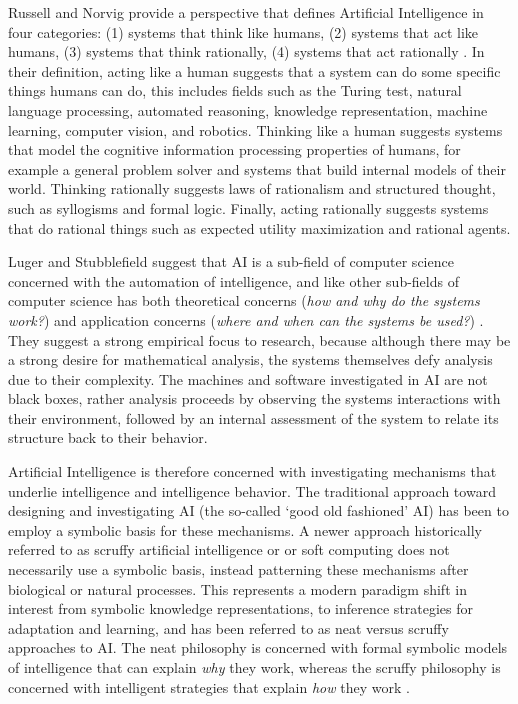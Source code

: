 \documentclass[a4paper, 11pt]{article}
\begin{document}
Russell and Norvig provide a perspective that defines Artificial Intelligence in four categories: (1) systems that think like humans, (2) systems that act like humans, (3) systems that think rationally, (4) systems that act rationally \cite{Russell2009}. In their definition, acting like a human suggests that a system can do some specific things humans can do, this includes fields such as the Turing test, natural language processing, automated reasoning, knowledge representation, machine learning, computer vision, and robotics. Thinking like a human suggests systems that model the cognitive information processing properties of humans, for example a general problem solver and systems that build internal models of their world. Thinking rationally suggests laws of rationalism and structured thought, such as syllogisms and formal logic. Finally, acting rationally suggests systems that do rational things such as expected utility maximization and rational agents. 

Luger and Stubblefield suggest that AI is a sub-field of computer science concerned with the automation of intelligence, and like other sub-fields of computer science has both theoretical concerns (\emph{how and why do the systems work?}) and application concerns (\emph{where and when can the systems be used?}) \cite{Luger1993}. They suggest a strong empirical focus to research, because although there may be a strong desire for mathematical analysis, the systems themselves defy analysis due to their complexity. The machines and software investigated in AI are not black boxes, rather analysis proceeds by observing the systems interactions with their environment, followed by an internal assessment of the system to relate its structure back to their behavior.

Artificial Intelligence is therefore concerned with investigating mechanisms that underlie intelligence and intelligence behavior. The traditional approach toward designing and investigating AI (the so-called `good old fashioned' AI) has been to employ a symbolic basis for these mechanisms. A newer approach historically referred to as scruffy artificial intelligence or or soft computing does not necessarily use a symbolic basis, instead patterning these mechanisms after biological or natural processes. This represents a modern paradigm shift in interest from symbolic knowledge representations, to inference strategies for adaptation and learning, and has been referred to as neat versus scruffy approaches to AI. The neat philosophy is concerned with formal symbolic models of intelligence that can explain \emph{why} they work, whereas the scruffy philosophy is concerned with intelligent strategies that explain \emph{how} they work \cite{Sloman1990}.
\end{document}
